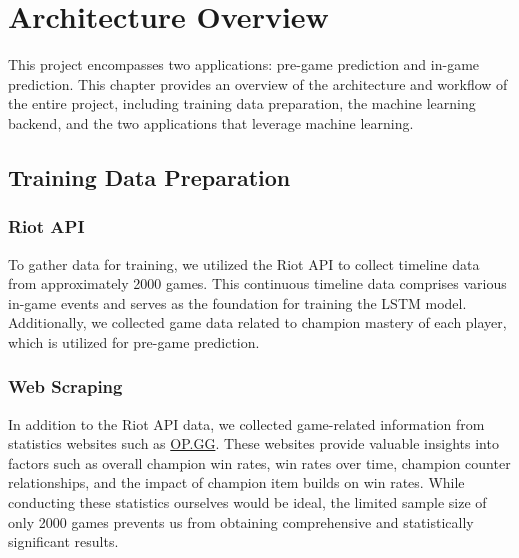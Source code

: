 \documentclass[11pt,a4paper,oneside]{report}
\newcommand{\instructions}[1]{{\color{orange}\itshape #1}}
\renewcommand{\instructions}[1]{}
\begin{document}
\instructions{The discussion section is where you interpret and compare the
  results. The objective is to point out the features and limitations of
  the work. Relate your results to current knowledge in the field and to
  the original purpose for undertaking the project.}


\chapter{Architecture Overview}
\label{architecture_overview}

This project encompasses two applications: pre-game prediction and in-game prediction. This chapter provides an overview of the architecture and workflow of the entire project, including training data preparation, the machine learning backend, and the two applications that leverage machine learning.

\section{Training Data Preparation}

\subsection{Riot API}

To gather data for training, we utilized the Riot API \cite{riot-api} to collect timeline data from approximately 2000 games. This continuous timeline data comprises various in-game events and serves as the foundation for training the LSTM model. Additionally, we collected game data related to champion mastery of each player, which is utilized for pre-game prediction.

\subsection{Web Scraping}

In addition to the Riot API data, we collected game-related information from statistics websites such as \href{https://www.op.gg/}{OP.GG}. These websites provide valuable insights into factors such as overall champion win rates, win rates over time, champion counter relationships, and the impact of champion item builds on win rates. While conducting these statistics ourselves would be ideal, the limited sample size of only 2000 games prevents us from obtaining comprehensive and statistically significant results.
\end{document}
